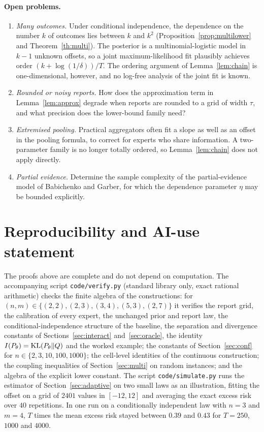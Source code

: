 \documentclass[11pt,a4paper]{article}
\theoremstyle{remark}
\newcommand{\KL}{\mathop{\rm KL}\nolimits}
\begin{document}
\paragraph{Open problems.}
\begin{enumerate}
\item \emph{Many outcomes.} Under conditional independence, the dependence on the number $k$ of outcomes lies between $k$ and $k^2$ (Proposition~\ref{prop:multilower} and Theorem~\ref{th:multi}). The posterior is a multinomial-logistic model in $k-1$ unknown offsets, so a joint maximum-likelihood fit plausibly achieves order $(k+\log(1/\delta))/T$. The ordering argument of Lemma~\ref{lem:chain} is one-dimensional, however, and no log-free analysis of the joint fit is known.
\item \emph{Rounded or noisy reports.} How does the approximation term in Lemma~\ref{lem:approx} degrade when reports are rounded to a grid of width $\tau$, and what precision does the lower-bound family need?
\item \emph{Extremised pooling.} Practical aggregators often fit a slope as well as an offset in the pooling formula, to correct for experts who share information. A two-parameter family is no longer totally ordered, so Lemma~\ref{lem:chain} does not apply directly.
\item \emph{Partial evidence.} Determine the sample complexity of the partial-evidence model of Babichenko and Garber, for which the dependence parameter $\eta$ may be bounded explicitly.
\end{enumerate}

\section{Reproducibility and AI-use statement}\label{sec:repro}
The proofs above are complete and do not depend on computation. The accompanying script \texttt{code/verify.py} (standard library only, exact rational arithmetic) checks the finite algebra of the constructions: for $(n,m)\in\{(2,2),(2,3),(3,4),(5,3),(2,7)\}$ it verifies the report grid, the calibration of every expert, the unchanged prior and report law, the conditional-independence structure of the baseline, the separation and divergence constants of Sections~\ref{sec:interact} and~\ref{sec:oracle}, the identity $I(P_\theta)=\KL(P_\theta\|Q)$ and the worked example; the constants of Section~\ref{sec:conf} for $n\in\{2,3,10,100,1000\}$; the cell-level identities of the continuous construction; the coupling inequalities of Section~\ref{sec:multi} on random instances; and the algebra of the explicit lower constant. The script \texttt{code/simulate.py} runs the estimator of Section~\ref{sec:adaptive} on two small laws as an illustration, fitting the offset on a grid of $2401$ values in $[-12,12]$ and averaging the exact excess risk over $40$ repetitions. In one run on a conditionally independent law with $n=3$ and $m=4$, $T$ times the mean excess risk stayed between $0.39$ and $0.43$ for $T=250$, $1000$ and $4000$.
\end{document}
